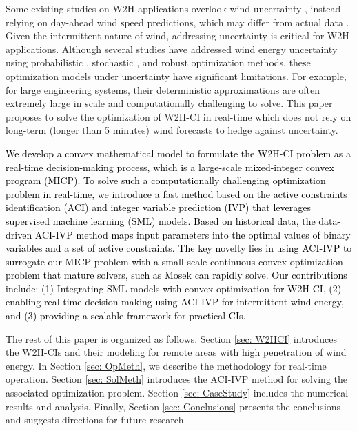 \documentclass[conference]{IEEEtran}
\begin{document}
Some existing studies on W2H applications overlook wind uncertainty \cite{sun2021integration}, instead relying on day-ahead wind speed predictions, which may differ from actual data \cite{khezri2021demand}. Given the intermittent nature of wind, addressing uncertainty is critical for W2H applications. Although several studies have addressed wind energy uncertainty using probabilistic \cite{li2021optimal}, stochastic \cite{wu2020cooperative}, and robust optimization \cite{gu2019power} methods, these optimization models under uncertainty have significant limitations. For example, for large engineering systems, their deterministic approximations are often extremely large in scale and computationally challenging to solve. This paper proposes to solve the optimization of W2H-CI in real-time which does not rely on long-term (longer than 5 minutes) wind forecasts to hedge against uncertainty. 


\textcolor{black}{We develop a convex mathematical model to formulate the W2H-CI problem as a real-time decision-making process,  which is a large-scale mixed-integer convex program (MICP). To solve such a computationally challenging optimization problem in real-time, we introduce a fast method based on the active constraints identification (ACI) and integer variable prediction (IVP) \cite{bertsimas2022online} that leverages supervised machine learning (SML) models. Based on historical data, the data-driven ACI-IVP method maps input parameters into the optimal values of binary variables and a set of active constraints. The key novelty lies in using ACI-IVP to surrogate our MICP problem with a small-scale continuous convex optimization problem that mature solvers, such as Mosek can rapidly solve. Our contributions include: (1) Integrating SML models with convex optimization for W2H-CI, (2) enabling real-time decision-making using ACI-IVP for intermittent wind energy, and (3) providing a scalable framework for practical CIs.}



The rest of this paper is organized as follows. Section \ref{sec: W2HCI} introduces the W2H-CIs and their modeling for remote areas with high penetration of wind energy. In Section \ref{sec: OpMeth}, we describe the methodology for real-time operation. Section \ref{sec: SolMeth} introduces the ACI-IVP method for solving the associated optimization problem. Section \ref{sec: CaseStudy} includes the numerical results and analysis. Finally, Section \ref{sec: Conclusions} presents the conclusions and suggests directions for future research.
\end{document}

